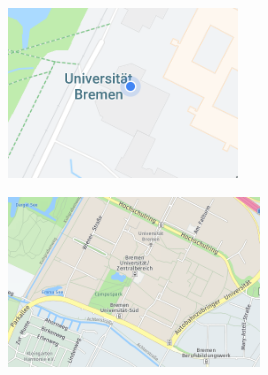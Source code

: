 
\begin{figure}
    \centering
    \begin{minipage}[t]{.485\textwidth}
        \centering
        \vspace{0pt}
        \includegraphics[width=\linewidth, height=4.5cm]{figures/map-app_examples/gm_positionsmarker}
        \label{fig:gm_positionsmarker}
        \vfill
    \end{minipage}
    \hfill
    \begin{minipage}[t]{.485\textwidth}
        \centering
        \vspace{0pt}
        \includegraphics[width=\linewidth, height=4.5cm]{figures/map-app_examples/hwg_labels}
        \label{fig:hwg_labels}
    \end{minipage}
\end{figure}

